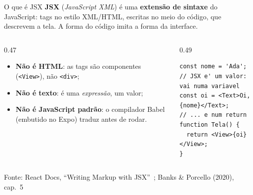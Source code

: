 \documentclass[aspectratio=169]{beamer}
\newcommand{\fonte}[1]{\vfill\hfill{\scriptsize\textcolor{UFSGray}{Fonte: #1}}}
\begin{document}
\begin{frame}[fragile]{O que é JSX}
  \textbf{JSX} (\emph{JavaScript XML}) é uma \textbf{extensão de sintaxe} do
  JavaScript: tags no estilo XML/HTML, escritas no meio do código, que
  descrevem a tela. A forma do código imita a forma da interface.
  \begin{columns}[T]
    \begin{column}{0.47\textwidth}
      \small
      \begin{itemize}
        \item \textbf{Não é HTML}: as tags são componentes
          (\texttt{<View>}), não \texttt{<div>};
        \item \textbf{Não é texto}: é uma \emph{expressão}, um valor;
        \item \textbf{Não é JavaScript padrão}: o compilador
          Babel (embutido no Expo) traduz antes de rodar.
      \end{itemize}
    \end{column}
    \begin{column}{0.49\textwidth}
\begin{lstlisting}[style=js]
const nome = 'Ada';
// JSX e' um valor: vai numa variavel
const oi = <Text>Oi, {nome}</Text>;
// ... e num return
function Tela() {
  return <View>{oi}</View>;
}
\end{lstlisting}
    \end{column}
  \end{columns}
  \fonte{React Docs, ``Writing Markup with JSX''~\cite{react2025docs};
    Banks \& Porcello (2020), cap.\ 5~\cite{banks2020learning}}
\end{frame}
\end{document}
